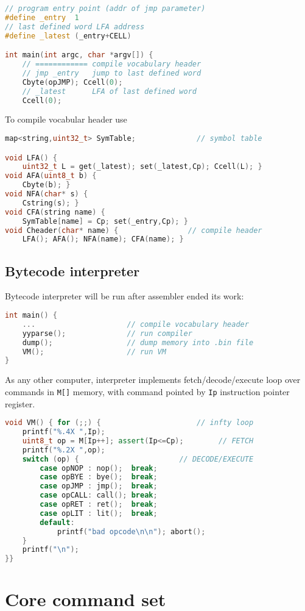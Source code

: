 \begin{lstlisting}[language=C++]
// program entry point (addr of jmp parameter)
#define _entry  1
// last defined word LFA address
#define _latest (_entry+CELL)

int main(int argc, char *argv[]) {
	// ============ compile vocabulary header
	// jmp _entry	jump to last defined word
	Cbyte(opJMP); Ccell(0);
	// _latest		LFA of last defined word
	Ccell(0);
\end{lstlisting}

To compile vocabular header use
\begin{lstlisting}[language=C++]
map<string,uint32_t> SymTable;				// symbol table

void LFA() {
	uint32_t L = get(_latest); set(_latest,Cp); Ccell(L); }
void AFA(uint8_t b) { 
	Cbyte(b); }
void NFA(char* s) { 
	Cstring(s); }
void CFA(string name) { 
	SymTable[name] = Cp; set(_entry,Cp); }
void Cheader(char* name) {				  // compile header
	LFA(); AFA(); NFA(name); CFA(name); }
\end{lstlisting}

\subsection{Bytecode interpreter}

Bytecode interpreter will be run after assembler ended its work:

\begin{lstlisting}[language=C++]
int main() {
	...						// compile vocabulary header
	yyparse();				// run compiler
	dump();					// dump memory into .bin file
	VM();					// run VM
}	
\end{lstlisting}

As any other computer, interpreter implements fetch/decode/execute loop over
commands in \verb|M[]| memory, with command pointed by \verb|Ip| instruction
pointer register.

\begin{lstlisting}[language=C++]
void VM() { for (;;) {						// infty loop
	printf("%.4X ",Ip);
	uint8_t op = M[Ip++]; assert(Ip<=Cp);		 // FETCH
	printf("%.2X ",op);
	switch (op) {						// DECODE/EXECUTE
		case opNOP : nop();  break;
		case opBYE : bye();  break;
		case opJMP : jmp();  break;
		case opCALL: call(); break;
		case opRET : ret();  break;
		case opLIT : lit();  break;
		default:
			printf("bad opcode\n\n"); abort();
	}
	printf("\n");
}}
\end{lstlisting}

\section{Core command set}

